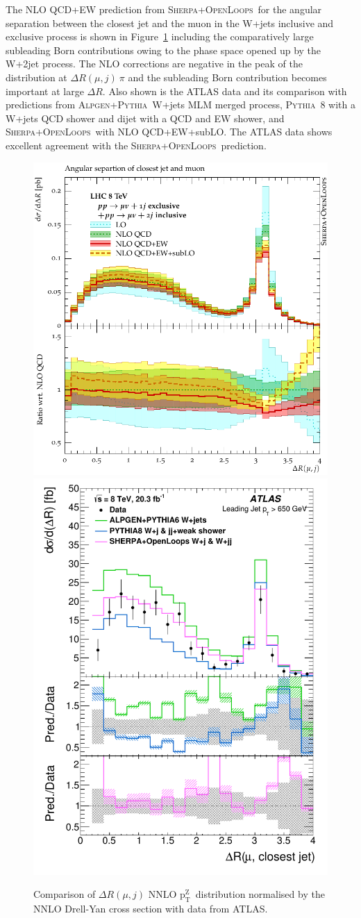 \documentclass[a4paper,11pt,notoc]{article}
\newcommand{\ptZ}{\ensuremath{\mathrm{p_T^{Z}}}}
\newcommand{\PYTHIA}{\textsc{Pythia}}
\newcommand{\SHERPA}{\textsc{Sherpa}}
\newcommand{\OPENLOOPS}{\textsc{OpenLoops}}
\newcommand{\ALPGEN}{\textsc{Alpgen}}
\begin{document}
The NLO QCD+EW prediction from \SHERPA+\OPENLOOPS\ for the angular separation between the closest jet and the muon in the W+jets inclusive and exclusive process is shown in Figure~\ref{fig:WinJet} including the comparatively large subleading Born contributions owing to the phase space opened up by the W+2jet process. The NLO corrections are negative in the peak of the distribution at $\Delta R(\mu,j) ~ \pi$ and the subleading Born contribution becomes important at large $\Delta R$.
Also shown is the ATLAS data and its comparison with predictions from \ALPGEN+\PYTHIA\ W+jets MLM merged process, \PYTHIA\ 8 with a W+jets QCD shower and dijet with a QCD and EW shower, and \SHERPA+\OPENLOOPS\ with NLO QCD+EW+subLO. The ATLAS data shows excellent agreement with the \SHERPA+\OPENLOOPS\ prediction. 


\begin{figure}[t!]
\centering
\includegraphics[width=0.495\columnwidth]{WinJet_dR_mu_jet_1jex2jin.pdf} 
\includegraphics[width=0.495\columnwidth]{fig_05b.pdf} 
\caption{Comparison of $\Delta R (\mu,j)$  NNLO \ptZ\ distribution normalised by the NNLO Drell-Yan cross section with data from ATLAS.}
\label{fig:WinJet}
\end{figure}   
\end{document}
